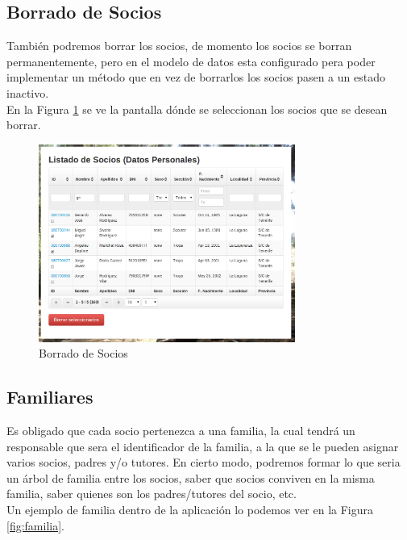 \subsection{Borrado de Socios}
También podremos borrar los socios, de momento los socios se borran permanentemente, pero en el modelo de datos esta configurado pera poder implementar un método que en vez de borrarlos los socios pasen
a un estado inactivo.\\

En la Figura \ref{fig:borrar_socio} se ve la pantalla dónde se seleccionan los socios que se desean borrar.\\

\begin{figure}[H]
\begin{center}
\includegraphics[width=0.75\textwidth]{images/borrado_socios.jpg}
\caption{Borrado de Socios}
\label{fig:borrar_socio}
\end{center}
\end{figure}

\subsection{Familiares}

Es obligado que cada socio pertenezca a una familia, la cual tendrá un responsable que sera el identificador de la familia, a la que se le pueden asignar varios socios, padres y/o tutores. En cierto modo, podremos
formar lo que seria un árbol de familia entre los socios, saber que socios conviven en la misma familia, saber quienes son los padres/tutores del socio, etc.\\

Un ejemplo de familia dentro de la aplicación lo podemos ver en la Figura \ref{fig:familia}.\\

